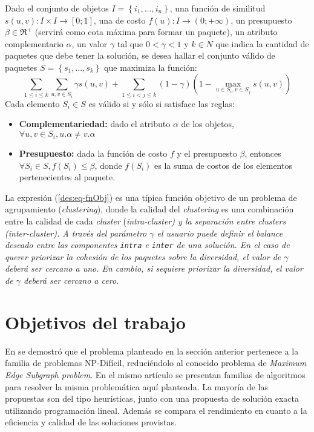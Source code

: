 Dado el conjunto de objetos $I=\left\{i_1,\ldots, i_n\right\}$, una función de similitud $s(u,v): I \times I \rightarrow [0;1]$, una de costo $f(u): I \rightarrow (0;+\infty)$, un presupuesto $\beta \in \Re^{+}$ (servirá como cota máxima para formar un paquete), un atributo complementario $\alpha$, un valor $\gamma$ tal que $0 < \gamma < 1$ y $k \in N$ que indica la cantidad de paquetes que debe tener la solución, se desea hallar el conjunto válido de paquetes $S = \left\{s_1, \ldots, s_k\right\}$ que maximiza la función:
\begin{equation} \label{des:eq-fnObj}
\sum_{1 \leq i \leq k}{\sum_{u,v \in S_i}{\gamma s(u,v)}} + \sum_{1 \leq i < j \leq k}{(1-\gamma) (1-\max_{u \in S_i, v \in S_j}{s(u,v)})}
\end{equation}
Cada elemento $S_i \in S$ es válido si y sólo si satisface las reglas:
\begin{itemize}
	\item \textbf{Complementariedad:} dado el atributo $\alpha$ de los objetos, $\forall u,v \in S_i, u.\alpha \neq v.\alpha$
	\item \textbf{Presupuesto:} dada la función de costo $f$ y el presupuesto $\beta$, entonces $\forall S_i \in S, f(S_i) \leq \beta$, donde $f(S_i)$ es la suma de costos de los elementos pertenecientes al paquete.
\end{itemize}		  

La expresión (\ref{des:eq-fnObj}) es una típica función objetivo de un problema de agrupamiento ({\em clustering}), donde la calidad del {\em clustering} es una combinación entre la calidad de cada {\em cluster} (\em{intra-cluster}) y la separación entre {\em clusters} (\em{inter-cluster}). A través del parámetro $\gamma$ el usuario puede definir el balance deseado entre las componentes \texttt{intra} e \texttt{inter} de una solución. En el caso de querer priorizar la cohesión de los paquetes sobre la diversidad, el  valor de $\gamma$ deberá ser cercano a uno. En cambio, si sequiere priorizar la diversidad, el valor de $\gamma$ deberá ser cercano a cero.

\section{Objetivos del trabajo}
En \cite{journals/tkde/Amer-YahiaBCFMZ14} se demostró que el problema planteado en la sección anterior pertenece a la familia de problemas NP-Difícil, reduciéndolo al conocido problema de {\em Maximum Edge Subgraph problem}. En el mismo artículo se presentan familias de algoritmos para resolver la misma problemática aquí planteada. La mayoría de las propuestas son del tipo heurísticas, junto con una propuesta de solución exacta utilizando programación lineal. Además se compara el rendimiento en cuanto a la eficiencia y calidad de las soluciones provistas.

